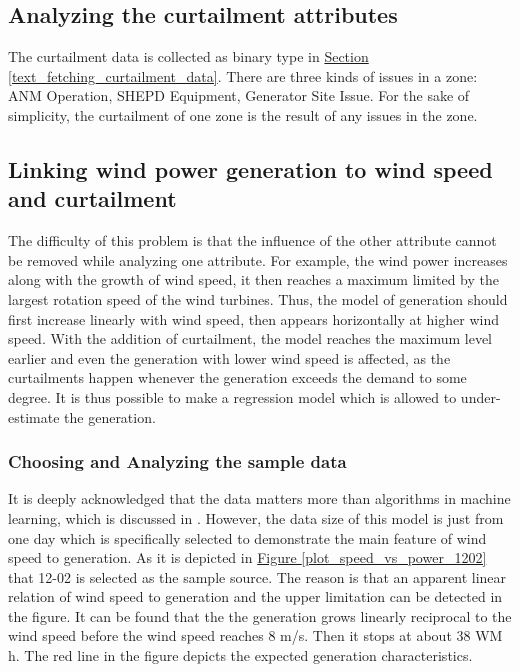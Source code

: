 \documentclass[12pt,a4paper]{report}
\begin{document}
                \subsection{Analyzing the curtailment attributes}
                The curtailment data is collected as binary type in \hyperref[text_fetching_curtailment_data]{Section \ref*{text_fetching_curtailment_data}}. There are three kinds of issues in a zone: ANM Operation, SHEPD Equipment, Generator Site Issue. For the sake of simplicity, the curtailment of one zone is the result of any issues in the zone.

                \subsection{Linking wind power generation to wind speed and curtailment}
                The difficulty of this problem is that the influence of the other attribute cannot be removed while analyzing one attribute. For example, the wind power increases along with the growth of wind speed, it then reaches a maximum limited by the largest rotation speed of the wind turbines. Thus, the model of generation should first increase linearly with wind speed, then appears horizontally at higher wind speed. With the addition of curtailment, the model reaches the maximum level earlier and even the generation with lower wind speed is affected, as the curtailments happen whenever the generation exceeds the demand to some degree.
                It is thus possible to make a regression model which is allowed to under-estimate the generation.
                \label{text_wind_regression_model}
                    \subsubsection{Choosing and Analyzing the sample data}
                    It is deeply acknowledged that the data matters more than algorithms in machine learning, which is discussed in \cite{paper:datasize}. However, the data size of this model is just from one day which is specifically selected to demonstrate the main feature of wind speed to generation.
                    As it is depicted in \hyperref[plot_speed_vs_power_1202]{Figure \ref*{plot_speed_vs_power_1202}} that 12-02 is selected as the sample source. The reason is that an apparent linear relation of wind speed to generation and the upper limitation can be detected in the figure.
                    It can be found that the the generation grows linearly reciprocal to the wind speed before the wind speed reaches 8 m/s. Then it stops at about 38 WM h. The red line in the figure depicts the expected generation characteristics.
\end{document}

